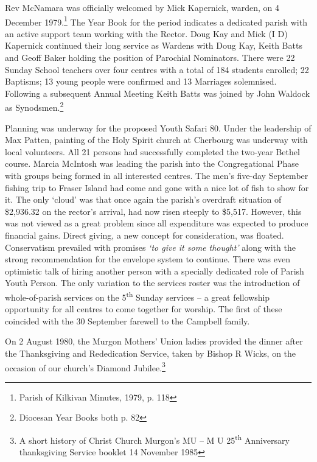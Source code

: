 Rev McNamara was officially welcomed by Mick Kapernick, warden, on 4 December 1979.\footnote{Parish of Kilkivan Minutes, 1979, p. 118} The Year Book for the period indicates a dedicated parish with an active support team working with the Rector. Doug Kay and Mick (I D) Kapernick continued their long service as Wardens with Doug Kay, Keith Batts and Geoff Baker holding the position of Parochial Nominators. There were 22 Sunday School teachers over four centres with a total of 184 students enrolled; 22 Baptisms; 13 young people were confirmed and 13 Marriages solemnised. Following a subsequent Annual Meeting Keith Batts was joined by John Waldock as Synodsmen.\footnote{Diocesan Year Books both p. 82}


Planning was underway for the proposed Youth Safari 80. Under the leadership of Max Patten, painting of the Holy Spirit church at Cherbourg was underway with local volunteers. All 21 persons had successfully completed the two-year Bethel course. Marcia McIntosh was leading the parish into the Congregational Phase with groups being formed in all interested centres. The men's five-day September fishing trip to Fraser Island had come and gone with a nice lot of fish to show for it. The only `cloud' was that once again the parish's overdraft situation of \$2,936.32 on the rector's arrival, had now risen steeply to \$5,517. However, this was not viewed as a great problem since all expenditure was expected to produce financial gains. Direct giving, a new concept for consideration, was floated. Conservatism prevailed with promises \emph{`to give it some thought'} along with the strong recommendation for the envelope system to continue. There was even optimistic talk of hiring another person with a specially dedicated role of Parish Youth Person. The only variation to the services roster was the introduction of whole-of-parish services on the 5\textsuperscript{th} Sunday services -- a great fellowship opportunity for all centres to come together for worship. The first of these coincided with the 30 September farewell to the Campbell family.



On 2 August 1980, the Murgon Mothers' Union ladies provided the dinner after the Thanksgiving and Rededication Service, taken by Bishop R Wicks, on the occasion of our church's Diamond Jubilee.\footnote{A short history of Christ Church Murgon's MU -- M U 25\textsuperscript{th} Anniversary thanksgiving Service booklet 14 November 1985}


